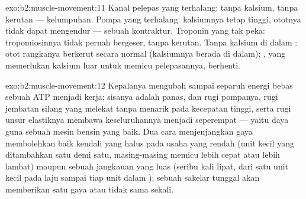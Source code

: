 \begin{solution}{exo:b2:muscle-movement:11}
Kanal pelepas yang terhalang: tanpa kalsium, tanpa kerutan ---
kelumpuhan. Pompa yang terhalang: kalsiumnya tetap tinggi, ototnya
tidak dapat mengendur --- sebuah kontraktur. Troponin yang tak peka:
tropomiosinnya tidak pernah bergeser, tanpa kerutan. Tanpa kalsium di
dalam : otot rangkanya berkerut secara normal (kalsiumnya
berada di dalam); , yang memerlukan kalsium luar untuk
memicu pelepasannya, berhenti.
\end{solution}

\begin{solution}{exo:b2:muscle-movement:12}
Kepalanya mengubah sampai separuh energi bebas sebuah ATP menjadi
kerja; sisanya adalah panas, dan rugi pompanya, rugi jembatan silang
yang melekat tanpa menarik pada kecepatan tinggi, serta rugi unsur
elastiknya membawa keseluruhannya menjadi seperempat --- yaitu daya
guna sebuah mesin bensin yang baik. Dua cara menjenjangkan gaya
membolehkan baik kendali yang halus pada usaha yang rendah (unit kecil
yang ditambahkan satu demi satu, masing-masing memicu lebih cepat atau
lebih lambat) maupun sebuah jangkauan yang luas (seribu kali lipat,
dari satu unit kecil pada laju  sampai tiap unit dalam );
sebuah sakelar tunggal akan memberikan satu gaya atau tidak sama sekali.
\end{solution}

